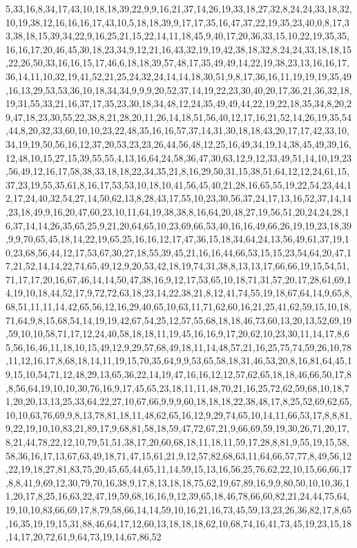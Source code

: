 \documentclass[11pt]{article}
\begin{document}
\begin{vncode}
5,33,16,8,34,17,43,10,18,18,39,22,9,9,16,21,37,14,26,19,33,18,27,32,8,24,24,33,18,32,10,19,38,12,16,16,16,17,43,10,5,18,18,39,9,17,17,35,16,47,37,22,19,35,23,40,0,8,17,33,38,18,15,39,34,22,9,16,25,21,15,22,14,11,18,45,9,40,17,20,36,33,15,10,22,19,35,35,16,16,17,20,46,45,30,18,23,34,9,12,21,16,43,32,19,19,42,38,18,32,8,24,24,33,18,18,15,22,26,50,33,16,16,15,17,46,6,18,18,39,57,48,17,35,49,49,14,22,19,38,23,13,16,16,17,36,14,11,10,32,19,41,52,21,25,24,32,24,14,14,18,30,51,9,8,17,36,16,11,19,19,19,35,49,16,13,29,53,53,36,10,18,34,34,9,9,9,20,52,37,14,19,22,23,30,40,20,17,36,21,36,32,18,19,31,55,33,21,16,37,17,35,23,30,18,34,48,12,24,35,49,49,44,22,19,22,18,35,34,8,20,29,47,18,23,30,55,22,38,8,21,28,20,11,26,14,18,51,56,40,12,17,16,21,52,14,26,19,35,54,44,8,20,32,33,60,10,10,23,22,48,35,16,16,57,37,14,31,30,18,18,43,20,17,17,42,33,10,34,19,19,50,56,16,12,37,20,53,23,23,26,44,56,48,12,25,16,49,34,19,14,38,45,49,39,16,12,48,10,15,27,15,39,55,55,4,13,16,64,24,58,36,47,30,63,12,9,12,33,49,51,14,10,19,23,56,49,12,16,17,58,38,33,18,18,22,34,35,21,8,16,29,50,31,15,38,51,64,12,12,24,61,15,37,23,19,55,35,61,8,16,17,53,53,10,18,10,41,56,45,40,21,28,16,65,55,19,22,54,23,44,12,17,24,40,32,54,27,14,50,62,13,8,28,43,17,55,10,23,30,56,37,24,17,13,16,52,37,14,14,23,18,49,9,16,20,47,60,23,10,11,64,19,38,38,8,16,64,20,48,27,19,56,51,20,24,24,28,16,37,14,14,26,35,65,25,9,21,20,64,65,10,23,69,66,53,40,16,16,49,66,26,19,19,23,18,39,9,9,70,65,45,18,14,22,19,65,25,16,16,12,17,47,36,15,18,34,64,24,13,56,49,61,37,19,10,23,68,56,44,12,17,53,67,30,27,18,55,39,45,21,16,16,44,66,53,15,15,23,54,64,20,47,17,21,52,14,14,22,74,65,49,12,9,20,53,42,18,19,74,31,38,8,13,13,17,66,66,19,15,54,51,71,17,17,20,16,67,46,14,14,50,47,38,16,9,12,17,53,65,10,18,71,31,57,20,17,28,61,69,14,19,10,18,44,52,17,9,72,72,63,18,23,14,22,38,21,8,12,41,74,55,19,18,67,64,14,9,65,8,68,51,11,11,14,42,65,56,12,16,29,40,65,10,63,11,71,62,60,16,21,25,41,62,59,15,10,18,71,64,9,8,15,68,54,14,19,19,42,67,54,25,12,57,55,68,18,18,46,73,60,13,20,13,52,69,19,59,10,10,58,71,17,12,24,40,58,18,18,11,19,45,16,16,9,17,20,62,10,23,30,11,14,17,8,65,56,16,46,11,18,10,15,49,12,9,29,57,68,49,18,11,14,48,57,21,16,25,75,74,59,26,10,78,11,12,16,17,8,68,18,14,11,19,15,70,35,64,9,9,53,65,58,18,31,46,53,20,8,16,81,64,45,19,15,10,54,71,12,48,29,13,65,36,22,14,19,47,16,16,12,12,57,62,65,18,18,46,66,50,17,8,8,56,64,19,10,10,30,76,16,9,17,45,65,23,18,11,11,48,70,21,16,25,72,62,59,68,10,18,71,20,20,13,13,25,33,64,22,27,10,67,66,9,9,9,60,18,18,18,22,38,48,17,8,25,52,69,62,65,10,10,63,76,69,9,8,13,78,81,18,11,48,62,65,16,12,9,29,74,65,10,14,11,66,53,17,8,8,81,9,22,19,10,10,83,21,89,17,9,68,81,58,18,59,47,72,67,21,9,66,69,59,19,30,26,71,20,17,8,21,44,78,22,12,10,79,51,51,38,17,20,60,68,18,11,18,11,59,17,28,8,81,9,55,19,15,58,58,36,16,17,13,67,63,49,18,71,47,15,61,21,9,12,57,82,68,63,11,64,66,57,77,8,49,56,12,22,19,18,27,81,83,75,20,45,65,44,65,11,14,59,15,13,16,56,25,76,62,22,10,15,66,66,17,8,8,41,9,69,12,30,79,70,16,38,9,17,8,13,18,18,75,62,19,67,89,16,9,9,80,50,10,10,36,11,20,17,8,25,16,63,22,47,19,59,68,16,16,9,12,39,65,18,46,78,66,60,82,21,24,44,75,64,19,10,10,83,66,69,17,8,79,58,66,14,14,59,10,16,21,16,73,45,59,13,23,26,36,82,17,8,65,16,35,19,19,15,31,88,46,64,17,12,60,13,18,18,18,62,10,68,74,16,41,73,45,19,23,15,18,14,17,20,72,61,9,64,73,19,14,67,86,52
\end{vncode}
\end{document}
